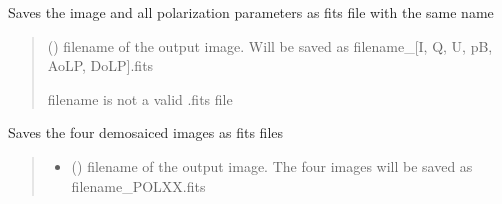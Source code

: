 \documentclass[letterpaper,10pt,english]{sphinxmanual}
\begin{document}
\begin{fulllineitems}
\begin{fulllineitems}
\end{fulllineitems}


\begin{fulllineitems}
\label{\detokenize{micropolarray:micropolarray.micropol_image.MicropolImage.save_all_pol_params_as_fits}}
\pysigstartsignatures
{}
\pysigstopsignatures
\sphinxAtStartPar
Saves the image and all polarization parameters as fits file with the same name
\begin{quote}\begin{description}
\sphinxAtStartPar
{} () \textendash{} filename of the output image. Will be saved as filename\_{[}I, Q, U, pB, AoLP, DoLP{]}.fits

\sphinxAtStartPar
{} \textendash{} filename is not a valid .fits file

\end{description}\end{quote}

\end{fulllineitems}


\begin{fulllineitems}
\label{\detokenize{micropolarray:micropolarray.micropol_image.MicropolImage.save_demosaiced_images_as_fits}}
\pysigstartsignatures
{}
\pysigstopsignatures
\sphinxAtStartPar
Saves the four demosaiced images as fits files
\begin{quote}\begin{description}
\begin{itemize}
\item {} 
\sphinxAtStartPar
{} () \textendash{} filename of the output image. The four images will be saved as filename\_POLXX.fits


\end{itemize}
\end{description}
\end{quote}
\end{fulllineitems}
\end{fulllineitems}
\end{document}
